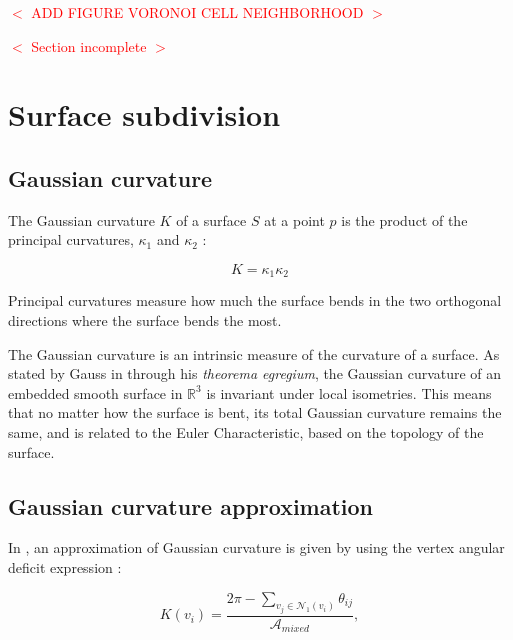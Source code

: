 \documentclass[11pt,fleqn]{book} %
\newcommand{\arnaud}[1]{\textcolor{red}{$<$ #1 $>$}}
\begin{document}
\arnaud{ADD FIGURE VORONOI CELL NEIGHBORHOOD}

\arnaud{Section incomplete}

\section{Surface subdivision}
\label{sec:surface_subdivision}




\printindex

\begin{appendices}
\section{Gaussian curvature}
\label{sec:gaussian_curvature}
The Gaussian curvature $K$ of a surface $S$ at a point $p$ is the product of the principal curvatures, $\kappa_1$ and $\kappa_2$ :

\begin{equation}
	K = \kappa_1\kappa_2
\end{equation}

Principal curvatures measure how much the surface bends in the two orthogonal directions where the surface bends the most.

The Gaussian curvature is an intrinsic measure of the curvature of a surface. 
As stated by Gauss in \cite{Gau28} through his \textit{theorema egregium}, the Gaussian curvature of an embedded smooth surface in $\mathbb{R}^3$ is invariant under local isometries.
This means that no matter how the surface is bent, its total Gaussian curvature remains the same, and is related to the Euler Characteristic, based on the topology of the surface.

\subsection{Gaussian curvature approximation}
In \cite{MMPB02}, an approximation of Gaussian curvature is given by using the vertex angular deficit expression :

\begin{equation}
	K(v_i) = \frac{2\pi -\sum_{v_j \in \mathcal{N}_1(v_i)} \theta_{ij}}{\mathcal{A}_{mixed}},
\end{equation}


\end{appendices}
\end{document}
